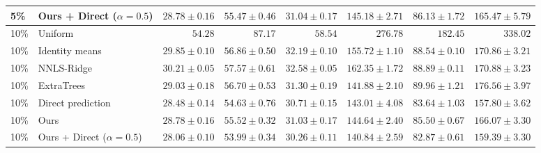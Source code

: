 \begin{table}[t]
\begin{tabular}{llrrrrrr}
5\% & Ours + Direct ($\alpha=0.5$) & $\mathbf{28.78\pm0.16}$ & $\mathbf{55.47\pm0.46}$ & $\mathbf{31.04\pm0.17}$ & $\mathbf{145.18\pm2.71}$ & $\mathbf{86.13\pm1.72}$ & $165.47\pm5.79$\\
\midrule
10\% & Uniform & $54.28$ & $87.17$ & $58.54$ & $276.78$ & $182.45$ & $338.02$\\
10\% & Identity means & $29.85\pm0.10$ & $56.86\pm0.50$ & $32.19\pm0.10$ & $155.72\pm1.10$ & $88.54\pm0.10$ & $170.86\pm3.21$\\
10\% & NNLS-Ridge & $30.21\pm0.05$ & $57.57\pm0.61$ & $32.58\pm0.05$ & $162.35\pm1.72$ & $88.89\pm0.11$ & $170.88\pm3.23$\\
10\% & ExtraTrees & $29.03\pm0.18$ & $56.70\pm0.53$ & $31.30\pm0.19$ & $141.88\pm2.10$ & $89.96\pm1.21$ & $176.56\pm3.97$\\
10\% & Direct prediction & $28.48\pm0.14$ & $54.63\pm0.76$ & $30.71\pm0.15$ & $143.01\pm4.08$ & $83.64\pm1.03$ & $\mathbf{157.80\pm3.62}$\\
10\% & Ours & $28.78\pm0.16$ & $55.52\pm0.32$ & $31.03\pm0.17$ & $144.64\pm2.40$ & $85.50\pm0.67$ & $166.07\pm3.30$\\
10\% & Ours + Direct ($\alpha=0.5$) & $\mathbf{28.06\pm0.10}$ & $\mathbf{53.99\pm0.34}$ & $\mathbf{30.26\pm0.11}$ & $\mathbf{140.84\pm2.59}$ & $\mathbf{82.87\pm0.61}$ & $159.39\pm3.30$\\
\bottomrule\end{tabular}
\end{table}
